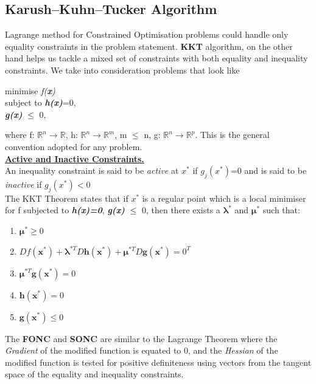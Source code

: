 \documentclass[12pt,a4paper,titlepage]{article}
\begin{document}
\subsection{Karush–Kuhn–Tucker Algorithm}
Lagrange method for Constrained Optimisation problems could handle only equality constraints in the problem statement. \textbf{KKT} algorithm, on the other hand helps us tackle a mixed set of constraints with both equality and inequality constraints. We take into consideration problems that look like
\begin{center}
    minimise \textit{f(\textbf{x})}\\
    subject to \textit{\textbf{h(x)}}=0,\\
    \hspace{1.90 cm} \textit{\textbf{g(x)}} $\leq$ 0,
\end{center}
where f: $\mathbb{R}^{n}\rightarrow\mathbb{R}$, h: $\mathbb{R}^{n}\rightarrow\mathbb{R}^{m}$, m $\leq$ n, g: $\mathbb{R}^{n}\rightarrow\mathbb{R}^{p}$. This is the general convention adopted for any problem.\\[1\baselineskip]
\textbf{\underline{Active and Inactive Constraints.}}\\
An inequality constraint is said to be \textit{active} at $x^{*}$ if $g_{j}(x^{*})$=0 and is said to be \textit{inactive} if $g_{j}(x^{*}) < 0$ \\
The KKT Theorem states that if $x^{*}$ is a regular point which is a local minimiser for f subjected to \textit{\textbf{h(x)=0}}, \textit{\textbf{g(x)}} $\leq$ 0, then there exists a $\boldsymbol{\lambda^{*}}$ and $\boldsymbol{\mu^{*}}$ such that:
\begin{enumerate}
    \item $\boldsymbol{\mu}^{*} \geq 0$
    \item $ Df(\boldsymbol{x}^{*})+ \boldsymbol{\lambda}^{*T}D\boldsymbol{h(x^{*})} + \boldsymbol{\mu}^{*T}D\boldsymbol{g(x^{*})} = 0^{T}$
    \item $\boldsymbol{\mu}^{*T}\boldsymbol{g(x^{*})} = 0$
    \item $\boldsymbol{h(x^{*})}=0$
    \item $\boldsymbol{g(x^{*})} \leq 0$
\end{enumerate}
The \textbf{FONC} and \textbf{SONC} are similar to the Lagrange Theorem where the \textit{Gradient} of the modified function is equated to 0, and the \textit{Hessian} of the modified function is tested for positive definiteness using vectors from the tangent space of the equality and inequality constraints. 
\end{document}
